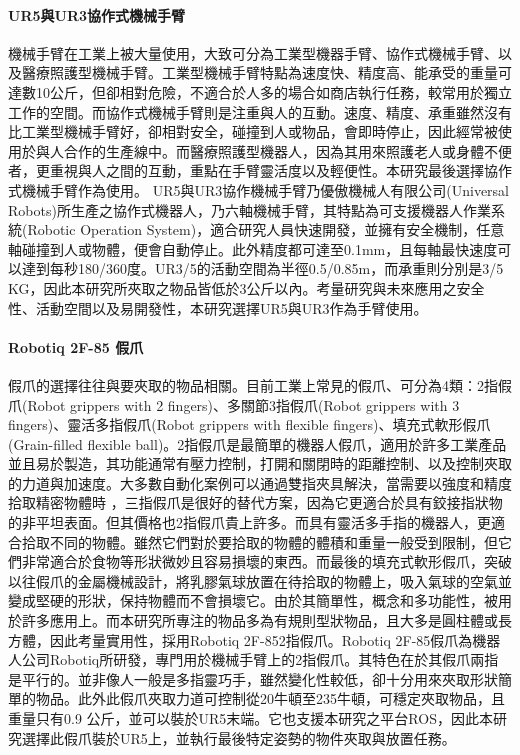 \paragraph{UR5與UR3協作式機械手臂}
機械手臂在工業上被大量使用，大致可分為工業型機器手臂、協作式機械手臂、以及醫療照護型機械手臂。工業型機械手臂特點為速度快、精度高、能承受的重量可達數10公斤，但卻相對危險，不適合於人多的場合如商店執行任務，較常用於獨立工作的空間。而協作式機械手臂則是注重與人的互動。速度、精度、承重雖然沒有比工業型機械手臂好，卻相對安全，碰撞到人或物品，會即時停止，因此經常被使用於與人合作的生產線中。而醫療照護型機器人，因為其用來照護老人或身體不便者，更重視與人之間的互動，重點在手臂靈活度以及輕便性。本研究最後選擇協作式機械手臂作為使用。
UR5與UR3協作機械手臂乃優傲機械人有限公司(Universal Robots)所生產之協作式機器人，乃六軸機械手臂，其特點為可支援機器人作業系統(Robotic Operation System)，適合研究人員快速開發，並擁有安全機制，任意軸碰撞到人或物體，便會自動停止。此外精度都可達至0.1mm，且每軸最快速度可以達到每秒180/360度。UR3/5的活動空間為半徑0.5/0.85m，而承重則分別是3/5 KG，因此本研究所夾取之物品皆低於3公斤以內。考量研究與未來應用之安全性、活動空間以及易開發性，本研究選擇UR5與UR3作為手臂使用。


\paragraph{Robotiq 2F-85 假爪}
假爪的選擇往往與要夾取的物品相關。目前工業上常見的假爪、可分為4類：2指假爪(Robot grippers with 2 fingers)、多關節3指假爪(Robot grippers with 3 fingers)、靈活多指假爪(Robot grippers with flexible fingers)、填充式軟形假爪(Grain-filled flexible ball)。2指假爪是最簡單的機器人假爪，適用於許多工業產品並且易於製造，其功能通常有壓力控制，打開和關閉時的距離控制、以及控制夾取的力道與加速度。大多數自動化案例可以通過雙指夾具解決，當需要以強度和精度拾取精密物體時
，三指假爪是很好的替代方案，因為它更適合於具有鉸接指狀物的非平坦表面。但其價格也2指假爪貴上許多。而具有靈活多手指的機器人，更適合拾取不同的物體。雖然它們對於要拾取的物體的體積和重量一般受到限制，但它們非常適合於食物等形狀微妙且容易損壞的東西。而最後的填充式軟形假爪，突破以往假爪的金屬機械設計，將乳膠氣球放置在待拾取的物體上，吸入氣球的空氣並變成堅硬的形狀，保持物體而不會損壞它。由於其簡單性，概念和多功能性，被用於許多應用上。而本研究所專注的物品多為有規則型狀物品，且大多是圓柱體或長方體，因此考量實用性，採用Robotiq 2F-852指假爪。Robotiq 2F-85假爪為機器人公司Robotiq所研發，專門用於機械手臂上的2指假爪。其特色在於其假爪兩指是平行的。並非像人一般是多指靈巧手，雖然變化性較低，卻十分用來夾取形狀簡單的物品。此外此假爪夾取力道可控制從20牛頓至235牛頓，可穩定夾取物品，且重量只有0.9 公斤，並可以裝於UR5末端。它也支援本研究之平台ROS，因此本研究選擇此假爪裝於UR5上，並執行最後特定姿勢的物件夾取與放置任務。

